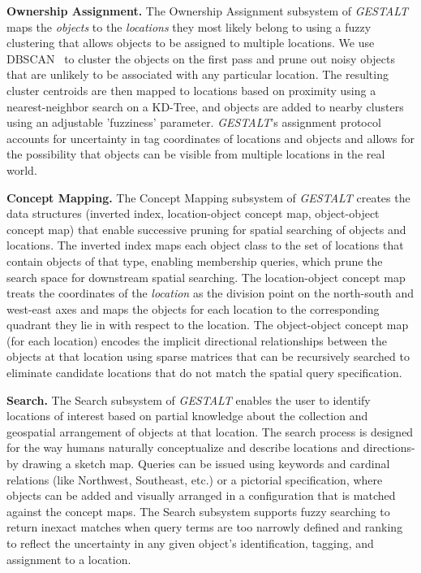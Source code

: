 \textbf{Ownership Assignment.}
The Ownership Assignment subsystem of \emph{GESTALT} maps the \textit{objects} to the \textit{locations} they most likely belong to using a fuzzy clustering that allows objects to be assigned to multiple locations. 
We use DBSCAN~\cite{DBSCAN} to cluster the objects on the first pass and prune out noisy objects that are unlikely to be associated with any particular location.
The resulting cluster centroids are then mapped to locations based on proximity using a nearest-neighbor search on a KD-Tree, and objects are added to nearby clusters using an adjustable 'fuzziness' parameter.
\emph{GESTALT}'s assignment protocol accounts for uncertainty in tag coordinates of locations and objects and allows for the possibility that objects can be visible from multiple locations in the real world.

\textbf{Concept Mapping.}
The Concept Mapping subsystem of \emph{GESTALT} creates the data structures (inverted index, location-object concept map, object-object concept map) that enable successive pruning for spatial searching of objects and locations. 
The inverted index maps each object class to the set of locations that contain objects of that type, enabling membership queries, which prune the search space for downstream spatial searching. 
The location-object concept map treats the coordinates of the \textit{location} as the division point on the north-south and west-east axes and maps the objects for each location to the corresponding quadrant they lie in with respect to the location.
The object-object concept map (for each location) encodes the implicit directional relationships between the objects at that location using sparse matrices that can be recursively searched to eliminate candidate locations that do not match the spatial query specification. 

\textbf{Search.}
The Search subsystem of \emph{GESTALT} enables the user to identify locations of interest based on partial knowledge about the collection and geospatial arrangement of objects at that location. 
The search process is designed for the way humans naturally conceptualize and describe locations and directions- by drawing a sketch map.
Queries can be issued using keywords and cardinal relations (like Northwest, Southeast, etc.) or a pictorial specification, where objects can be added and visually arranged in a configuration that is matched against the concept maps.
The Search subsystem supports fuzzy searching to return inexact matches when query terms are too narrowly defined and ranking to reflect the uncertainty in any given object's identification, tagging, and assignment to a location.

